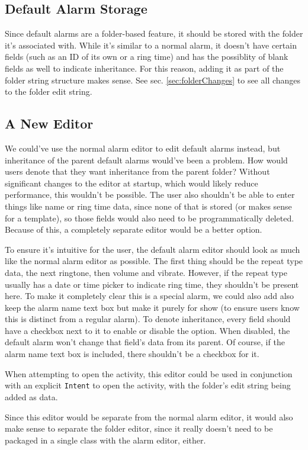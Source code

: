 \documentclass[11pt]{article} %
\begin{document}
\subsection{Default Alarm Storage}
Since default alarms are a folder-based feature, it should be stored with the folder it's associated with. While it's similar to a normal alarm, it doesn't have certain fields (such as an ID of its own or a ring time) and has the possiblity of blank fields as well to indicate inheritance. For this reason, adding it as part of the folder string structure makes sense. See sec. \ref{sec:folderChanges} to see all changes to the folder edit string.

\subsection{A New Editor}
We could've use the normal alarm editor to edit default alarms instead, but inheritance of the parent default alarms would've been a problem. How would users denote that they want inheritance from the parent folder? Without significant changes to the editor at startup, which would likely reduce performance, this wouldn't be possible. The user also shouldn't be able to enter things like name or ring time data, since none of that is stored (or makes sense for a template), so those fields would also need to be programmatically deleted. Because of this, a completely separate editor would be a better option.

To ensure it's intuitive for the user, the default alarm editor should look as much like the normal alarm editor as possible. The first thing should be the repeat type data, the next ringtone, then volume and vibrate. However, if the repeat type usually has a date or time picker to indicate ring time, they shouldn't be present here. To make it completely clear this is a special alarm, we could also add also keep the alarm name text box but make it purely for show (to ensure users know this is distinct from a regular alarm). To denote inheritance, every field should have a checkbox next to it to enable or disable the option. When disabled, the default alarm won't change that field's data from its parent. Of course, if the alarm name text box is included, there shouldn't be a checkbox for it.

When attempting to open the activity, this editor could be used in conjunction with an explicit \verb|Intent| to open the activity, with the folder's edit string being added as data. 

Since this editor would be separate from the normal alarm editor, it would also make sense to separate the folder editor, since it really doesn't need to be packaged in a single class with the alarm editor, either. 
\end{document}
